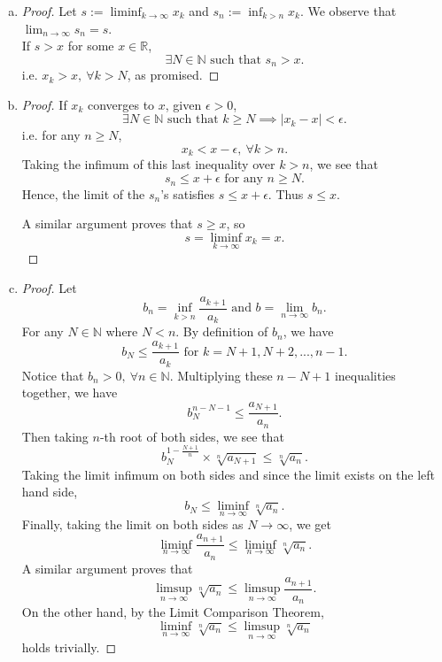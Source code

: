 \documentclass{report}
\begin{document}
\vspace{12pt}
\setcounter{Exercise}{7}
\begin{Exercise}
\begin{enumerate}[a)]
\item
\begin{proof}
Let $s:=\liminf_{k\to\infty}x_k$ and $s_n := \inf_{k>n}x_k$. We observe that $\lim_{n\to\infty}s_n = s$.\\
If $s>x$ for some $x\in\mathbb{R}$, $$\exists N\in\mathbb{N}\text{ such that } s_n>x.$$ i.e. $x_k>x,\ \forall k > N$, as promised.
\end{proof}

\item
\begin{proof}
If $x_k$ converges to $x$, given $\epsilon > 0$, $$\exists N \in\mathbb{N}\text{ such that } k\geq N \implies \left|x_k-x\right|<\epsilon.$$
i.e. for any $n\geq N$, $$x_k<x-\epsilon,\ \forall k>n.$$
Taking the infimum of this last inequality over $k>n$, we see that $$s_n\leq x+\epsilon\text{ for any } n\geq N.$$ Hence, the limit of the $s_n$'s satisfies $s\leq x+\epsilon$. Thus $s\leq x$.

\vspace{2ex}

A similar argument proves that $s\geq x$, so $$s=\liminf_{k\to\infty}x_k=x.$$
\end{proof}

\item
\begin{proof}
Let $$b_n = \inf_{k>n}\frac{a_{k+1}}{a_k} \text{ and } b = \lim_{n\to\infty}b_n.$$
For any $N\in\mathbb{N}$ where $N<n$. By definition of $b_n$, we have $$ b_N\leq\frac{a_{k+1}}{a_k}\text{ for } k=N+1,N+2,...,n-1.$$
Notice that $b_n>0,\ \forall n\in\mathbb{N}$. Multiplying these $n-N+1$ inequalities together, we have $$b_N^{n-N-1}\leq\frac{a_{N+1}}{a_n}.$$ Then taking $n$-th root of both sides, we see that $$b_N^{1-\frac{N+1}{n}} \times \sqrt[n]{a_{N+1}} \leq \sqrt[n]{a_n}.$$
Taking the limit infimum on both sides and since the limit exists on the left hand side, $$b_N \leq \liminf_{n\to\infty}\sqrt[n]{a_n}.$$
Finally, taking the limit on both sides as $N\to\infty$, we get $$\liminf_{n\to\infty}\frac{a_{n+1}}{a_n} \leq  \liminf_{n\to\infty}\sqrt[n]{a_n}.$$
A similar argument proves that  $$\limsup_{n\to\infty}\sqrt[n]{a_n} \leq \limsup_{n\to\infty}\frac{a_{n+1}}{a_n}.$$
On the other hand, by the Limit Comparison Theorem, $$\liminf_{n\to\infty}\sqrt[n]{a_n} \leq \limsup_{n\to\infty}\sqrt[n]{a_n}$$
holds trivially. 


\end{proof}
\end{enumerate}
\end{Exercise}
\end{document}

